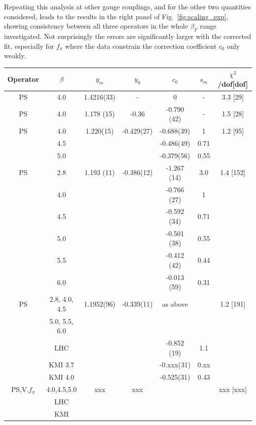 \documentclass[aps,prl,twocolumn,]{revtex4}  %
\newcommand{\fig}[1]{Fig.~\ref{#1}}
\begin{document}
Repeating this analysis at other gauge couplings, and for the other two quantities considered, leads to the results in the right panel of \fig{fig:scaling_exp}, showing consistency between all three operators in the whole $\beta_F$ range investigated.
Not surprisingly the errors are significantly larger with the corrected fit, especially for $f_\pi$ where the data constrain the correction coefficient $c_0$ only weakly.
\begin{table}[htdp]
\begin{center}
\begin{tabular}{|c|c|c|c|c|c|c|}
\hline
Operator & $\beta$ & $y_m$ & $y_0$ & $c_0$ &  $ s_m $  & $\chi^2$/dof[dof]   \\
\hline\hline
PS	&	4.0	& 	1.4216(33)	&	 - 		    &	0	        &	-	    	&	3.3 [29]	\\
\hline
PS	&	4.0	&	1.178 (15)	&	-0.36	    &	-0.790 (42)	&	-	    	&	1.5 [28] \\
\hline
PS	&	4.0	& 	1.220(15)	&	 -0.429(27) &	-0.688(39)	&	1	    &   1.2 [95] \\
	&	4.5	&		        &			    &	-0.486(49)	&	0.71   &	 	        \\
	&	5.0	&	        	&       		&	-0.379(56)	&	0.55	&		        \\
\hline
PS	&	2.8	& 	1.193 (11)	&	 -0.386(12) &	-1.267 (14)	&	3.0	    &	1.4 [152] \\
	&	4.0	& 	        	&	        	&	-0.766 (27)	&	1	    &		    \\
	&	4.5	&		        &		        &	-0.592 (34)	&	0.71	&	        \\
	&	5.0	&		        &		        &	-0.501 (38)	&	0.55	&	        \\
	&	5.5	&		        &		        &   -0.412 (42)	&	0.44	&	        \\
	&	6.0	&		        &		        &	-0.013 (59)	&	0.31	&	        \\
\hline
PS	&	2.8, 4.0, 4.5	& 	1.1952(96)	&	 -0.339(11)	&	as above	&		    &	1.2 [191] \\
	&	5.0, 5.5, 6.0	& 	        	&	        	&		&		    &		    \\
	&	LHC\protect\cite{Fodor:2011tu}	&	&			    &	-0.852 (19)	&	1.1 	& 	 \\
	&	KMI 3.7\protect\cite{Aoki:2012eq}	&	&			    &	-0.xxx(31)	&	0.xx &	 	 \\
	&	KMI 4.0\protect\cite{Aoki:2012eq}	&	&			    &	-0.525(31)	&	0.43 &	\\
\hline
PS,V,$f_\pi$	&	4.0,4.5,5.0	& 	xxx	&	xxx  	&		&		&	xxx [xxx]	\\
	&	LHC\protect\cite{Fodor:2011tu}	&		&			&		&		&	 \\
	&	KMI\protect\cite{Aoki:2012eq} 	&		&			&		&		&	 \\
\hline	
	

\end{tabular}
\end{center}
\end{table}
\end{document}
